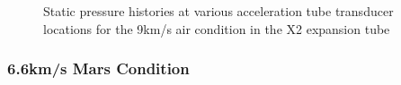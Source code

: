 \documentclass[a4paper,10pt]{article}
\begin{document}
\begin{figure}[p]
\centering
{} \hspace{0cm}
 \caption{Static pressure histories at various acceleration tube transducer locations for the 9km/s air condition in the X2 expansion tube}
\label{fig:air_atx} %
\end{figure}


\subsubsection{6.6km/s Mars Condition}
\end{document}
